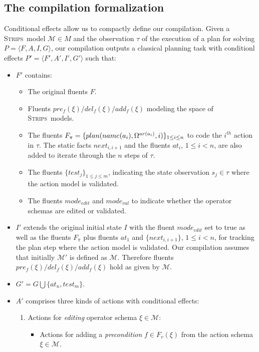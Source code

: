 \documentclass[letterpaper]{article} %
\newcommand{\tup}[1]{{\langle #1 \rangle}}
\newcommand{\strips}{\textsc{Strips}}     %
\begin{document}
\subsection{The compilation formalization}
Conditional effects allow us to compactly define our compilation. Given a \strips\ model $\mathcal{M}\in M$ and the observation $\tau$ of the execution of a plan for solving $P=\tup{F,A,I,G}$, our compilation outputs a classical planning task with conditionl effects $P'=\tup{F',A',I',G'}$ such that:
\begin{itemize}
\item $F'$ contains:
\begin{itemize}
\item The original fluents $F$. 
\item Fluents $pre_f(\xi)/del_f(\xi)/add_f(\xi)$ modeling the space of \strips\ models. 
\item The fluents $F_{\pi}=\{plan(name(a_i),\Omega^{ar(a_i)},i)\}_{\small 1\leq i\leq n}$ to code the $i^{th}$ action in $\tau$. The static facts $next_{i,i+1}$ and the fluents $at_i$, {\small $1\leq i< n$}, are also added to iterate through the $n$ steps of $\tau$.
\item The fluents $\{test_j\}_{1\leq j\leq m}$, indicating the state observation $s_j\in\tau$ where the action model is validated.
\item The fluents $mode_{edit}$ and $mode_{val}$ to indicate whether the operator schemas are edited or validated.
\end{itemize}
\item $I'$ extends the original initial state $I$ with the fluent $mode_{edit}$ set to true as well as the fluents $F_{\pi}$ plus fluents $at_1$ and $\{next_{i,i+1}\}$, {\small $1\leq i<n$}, for tracking the plan step where the action model is validated. Our compilation assumes that initially $\mathcal{M}'$ is defined as $\mathcal{M}$. Therefore fluents $pre_f(\xi)/del_f(\xi)/add_f(\xi)$ hold as given by $\mathcal{M}$.

\item $G'=G\bigcup\{at_n,test_m\}$.
\item $A'$ comprises three kinds of actions with conditional effects:
\begin{enumerate}
\item Actions for {\em editing} operator schema $\xi\in\mathcal{M}$:
\begin{itemize}
\item Actions for adding a {\em precondition} $f\in F_v(\xi)$ from the action schema $\xi\in\mathcal{M}$.


\end{itemize}
\end{enumerate}
\end{itemize}
\end{document}
